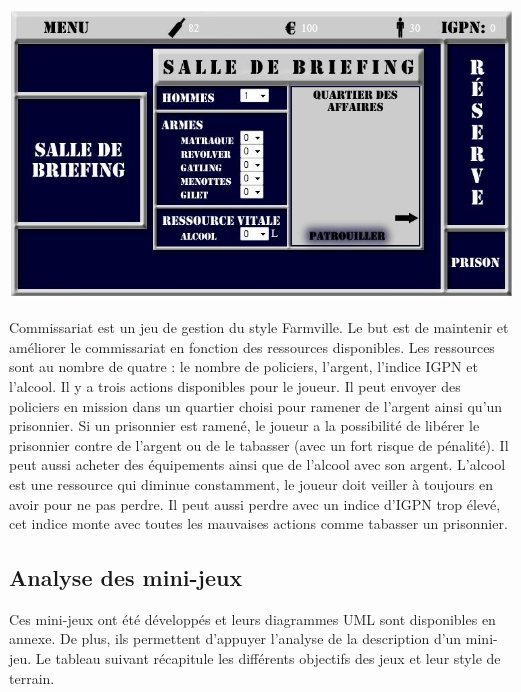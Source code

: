 \begin{minipage}{6cm}
 \includegraphics[width=\linewidth]{img/capturejeu_gestion2}
\end{minipage}
\hfill
\begin{minipage}{9cm}
Commissariat est un jeu de gestion du style Farmville. 
Le but est de maintenir et améliorer le commissariat en fonction des ressources disponibles.
Les ressources sont au nombre de quatre : le nombre de policiers, l’argent, l’indice IGPN et l’alcool. 
Il y a trois actions disponibles pour le joueur. Il peut envoyer des policiers en mission dans un quartier 
choisi pour ramener de l’argent ainsi qu’un prisonnier. Si un prisonnier est ramené, le joueur a la possibilité 
de libérer le prisonnier contre de l’argent ou de le tabasser (avec un fort risque de pénalité). 
Il peut aussi acheter des équipements ainsi que de l’alcool avec son argent. L’alcool est une ressource qui diminue constamment, 
le joueur doit veiller à toujours en avoir pour ne pas perdre. Il peut aussi perdre avec un indice d’IGPN trop élevé, cet indice 
monte avec toutes les mauvaises actions comme tabasser un prisonnier.
\end{minipage}

\vspace{0.8cm}

\subsection{Analyse des mini-jeux}

Ces mini-jeux ont été développés et leurs diagrammes UML sont disponibles en annexe.
De plus, ils permettent d'appuyer l'analyse de la description d'un mini-jeu.
Le tableau suivant récapitule les différents objectifs des jeux et leur style de terrain.

